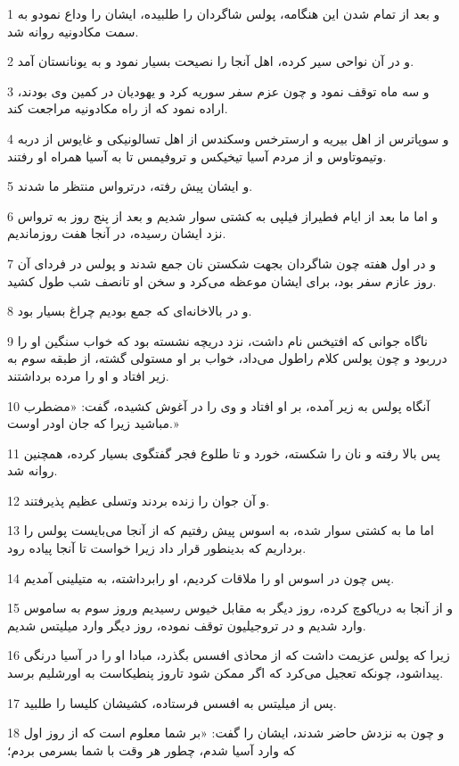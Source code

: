 \par 1 و بعد از تمام شدن این هنگامه، پولس شاگردان را طلبیده، ایشان را وداع نمودو به سمت مکادونیه روانه شد.
\par 2 و در آن نواحی سیر کرده، اهل آنجا را نصیحت بسیار نمود و به یونانستان آمد.
\par 3 و سه ماه توقف نمود و چون عزم سفر سوریه کرد و یهودیان در کمین وی بودند، اراده نمود که از راه مکادونیه مراجعت کند.
\par 4 و سوپاترس از اهل بیریه و ارسترخس وسکندس از اهل تسالونیکی و غایوس از دربه وتیموتاوس و از مردم آسیا تیخیکس و تروفیمس تا به آسیا همراه او رفتند.
\par 5 و ایشان پیش رفته، درترواس منتظر ما شدند.
\par 6 و اما ما بعد از ایام فطیراز فیلپی به کشتی سوار شدیم و بعد از پنج روز به ترواس نزد ایشان رسیده، در آنجا هفت روزماندیم.
\par 7 و در اول هفته چون شاگردان بجهت شکستن نان جمع شدند و پولس در فردای آن روز عازم سفر بود، برای ایشان موعظه می‌کرد و سخن او تانصف شب طول کشید.
\par 8 و در بالاخانه‌ای که جمع بودیم چراغ بسیار بود.
\par 9 ناگاه جوانی که افتیخس نام داشت، نزد دریچه نشسته بود که خواب سنگین او را درربود و چون پولس کلام راطول می‌داد، خواب بر او مستولی گشته، از طبقه سوم به زیر افتاد و او را مرده برداشتند.
\par 10 آنگاه پولس به زیر آمده، بر او افتاد و وی را در آغوش کشیده، گفت: «مضطرب مباشید زیرا که جان اودر اوست.»
\par 11 پس بالا رفته و نان را شکسته، خورد و تا طلوع فجر گفتگوی بسیار کرده، همچنین روانه شد.
\par 12 و آن جوان را زنده بردند وتسلی عظیم پذیرفتند.
\par 13 اما ما به کشتی سوار شده، به اسوس پیش رفتیم که از آنجا می‌بایست پولس را برداریم که بدینطور قرار داد زیرا خواست تا آنجا پیاده رود.
\par 14 پس چون در اسوس او را ملاقات کردیم، او رابرداشته، به متیلینی آمدیم.
\par 15 و از آنجا به دریاکوچ کرده، روز دیگر به مقابل خیوس رسیدیم وروز سوم به ساموس وارد شدیم و در تروجیلیون توقف نموده، روز دیگر وارد میلیتس شدیم.
\par 16 زیرا که پولس عزیمت داشت که از محاذی افسس بگذرد، مبادا او را در آسیا درنگی پیداشود، چونکه تعجیل می‌کرد که اگر ممکن شود تاروز پنطیکاست به اورشلیم برسد.
\par 17 پس از میلیتس به افسس فرستاده، کشیشان کلیسا را طلبید.
\par 18 و چون به نزدش حاضر شدند، ایشان را گفت: «بر شما معلوم است که از روز اول که وارد آسیا شدم، چطور هر وقت با شما بسرمی بردم؛
